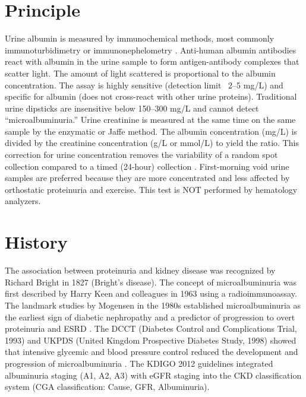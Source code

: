 \section*{Principle}
Urine albumin is measured by immunochemical methods, most commonly immunoturbidimetry or immunonephelometry \cite{tietz2012textbook}. Anti-human albumin antibodies react with albumin in the urine sample to form antigen-antibody complexes that scatter light. The amount of light scattered is proportional to the albumin concentration. The assay is highly sensitive (detection limit ~2--5 mg/L) and specific for albumin (does not cross-react with other urine proteins). Traditional urine dipsticks are insensitive below 150--300 mg/L and cannot detect ``microalbuminuria.'' Urine creatinine is measured at the same time on the same sample by the enzymatic or Jaffe method. The albumin concentration (mg/L) is divided by the creatinine concentration (g/L or mmol/L) to yield the ratio. This correction for urine concentration removes the variability of a random spot collection compared to a timed (24-hour) collection \cite{wallach2022interpretation}. First-morning void urine samples are preferred because they are more concentrated and less affected by orthostatic proteinuria and exercise. This test is NOT performed by hematology analyzers.

\section*{History}
The association between proteinuria and kidney disease was recognized by Richard Bright in 1827 (Bright's disease). The concept of microalbuminuria was first described by Harry Keen and colleagues in 1963 using a radioimmunoassay. The landmark studies by Mogensen in the 1980s established microalbuminuria as the earliest sign of diabetic nephropathy and a predictor of progression to overt proteinuria and ESRD \cite{mogensen1984microalbuminuria}. The DCCT (Diabetes Control and Complications Trial, 1993) and UKPDS (United Kingdom Prospective Diabetes Study, 1998) showed that intensive glycemic and blood pressure control reduced the development and progression of microalbuminuria \cite{ukpds1998intensive}. The KDIGO 2012 guidelines integrated albuminuria staging (A1, A2, A3) with eGFR staging into the CKD classification system (CGA classification: Cause, GFR, Albuminuria).

